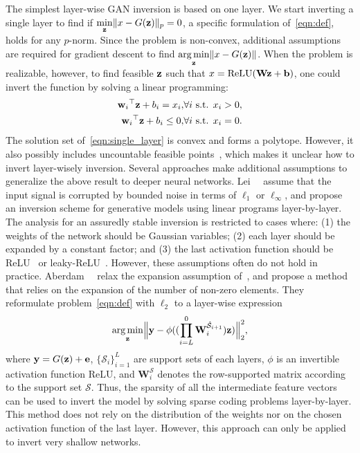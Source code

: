 The simplest layer-wise GAN inversion is based on one layer. 
We start inverting a single layer to find if $\underset{\mathbf{z}}\min\|x-G(\mathbf{z}) \|_p=0$, a specific formulation of~\eqref{eqn:def}, holds for any $p$-norm. 
Since the problem is non-convex, additional assumptions are required \cite{huang2018provably} for gradient descent to find $\underset{\mathbf{z}}{\arg\min}\|x-G(\mathbf{z})\|$.
When the problem is realizable, however, to find feasible $\mathbf{z}$ such that $x= \text{ReLU}(\mathbf{W}\mathbf{z}+\mathbf{b})$, one could invert the function by solving a linear programming:
\begin{eqnarray}
{\w_i}^\top \z + b_i = x_i, &\forall i \text{ s.t. } x_i>0, \nonumber\\
{\w_i}^\top \z + b_i\leq 0, &\forall i \text{ s.t. } x_i= 0.
\label{eqn:single_layer}
\end{eqnarray}
The solution set of~\eqref{eqn:single_layer} is convex and forms a polytope. 
However, it also possibly includes uncountable feasible points~\cite{lei2019inverting}, which makes it unclear how to invert layer-wisely inversion.
Several approaches make additional assumptions to generalize the above result to deeper neural networks. 
Lei~\etal~\cite{lei2019inverting} assume that the input signal is corrupted by bounded noise in terms of $\ell_1$ or $\ell_{\infty}$, and propose an inversion scheme for generative models using linear programs layer-by-layer. 
The analysis for an assuredly stable inversion is restricted to cases where: 
(1) the weights of the network should be Gaussian \iid variables; 
(2) each layer should be expanded by a constant factor; 
and (3) the last activation function should be ReLU~\cite{nair2010rectified} or leaky-ReLU~\cite{maas2013rectifier}.
However, these assumptions often do not hold in practice. 
Aberdam~\etal~\cite{aberdam2020invert} relax the expansion assumption of~\cite{lei2019inverting}, and propose a method that relies on the expansion of the number of non-zero elements. 
They reformulate problem~\eqref{eqn:def} with $\ell_2$ to a layer-wise expression
\begin{equation}
\underset{\mathbf{z}}{\arg\min} \Bigl\|\mathbf{y} - \phi((\prod_{i=L}^{0} \mathbf{W}_i^{\hat{\mathcal{S}}_{i+1}})\mathbf{z})\Bigr\|_2^2,
\end{equation}
where $\mathbf{y}=G(\mathbf{z})+\mathbf{e}$, $\{\mathcal{S}_i\}_{i=1}^L$ are support sets of each layers, $\phi$ is an invertible activation function ReLU, and $\mathbf{W}_i^{\mathcal{S}}$ denotes the row-supported matrix according to the support set $\mathcal{S}$. 
Thus, the sparsity of all the intermediate feature vectors can be used to invert the model by solving sparse coding problems layer-by-layer.
This method does not rely on the distribution of the weights nor on the chosen activation function of the last layer. 
However, this approach can only be applied to invert very shallow networks.


